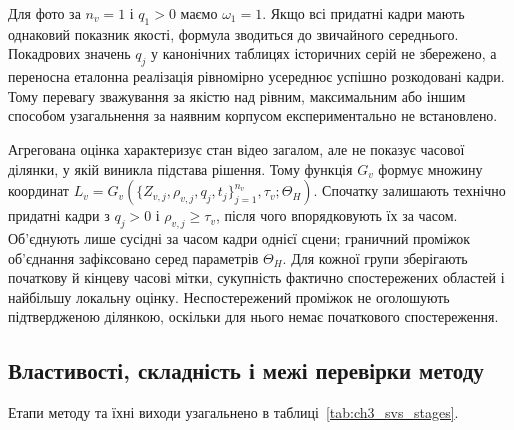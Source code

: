 Для фото за $n_v=1$ і $q_1>0$ маємо $\omega_1=1$. Якщо всі придатні кадри мають однаковий показник якості, формула зводиться до звичайного середнього. Покадрових значень $q_j$ у канонічних таблицях історичних серій не збережено, а переносна еталонна реалізація рівномірно усереднює успішно розкодовані кадри. Тому перевагу зважування за якістю над рівним, максимальним або іншим способом узагальнення за наявним корпусом експериментально не встановлено.

Агрегована оцінка характеризує стан відео загалом, але не показує часової ділянки, у якій виникла підстава рішення. Тому функція $G_v$ формує множину координат $L_v=G_v(\{Z_{v,j},\rho_{v,j},q_j,t_j\}_{j=1}^{n_v},\tau_v;\Theta_H)$. Спочатку залишають технічно придатні кадри з $q_j>0$ і $\rho_{v,j}\geq\tau_v$, після чого впорядковують їх за часом. Об’єднують лише сусідні за часом кадри однієї сцени; граничний проміжок об’єднання зафіксовано серед параметрів $\Theta_H$. Для кожної групи зберігають початкову й кінцеву часові мітки, сукупність фактично спостережених областей і найбільшу локальну оцінку. Неспостережений проміжок не оголошують підтвердженою ділянкою, оскільки для нього немає початкового спостереження.

\subsection{Властивості, складність і межі перевірки методу}

Етапи методу та їхні виходи узагальнено в таблиці~\ref{tab:ch3_svs_stages}.


